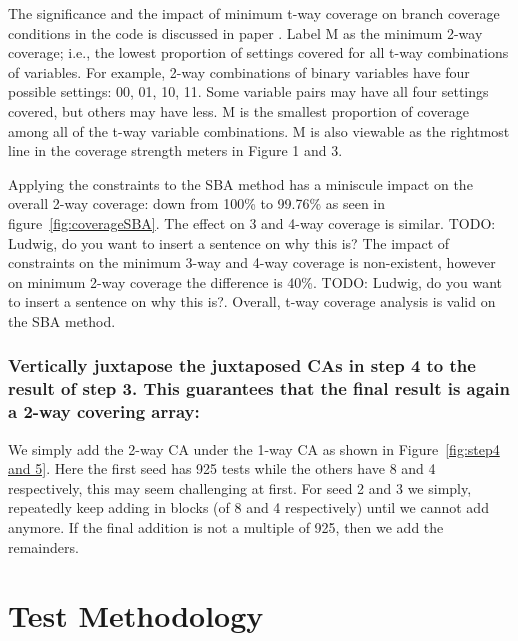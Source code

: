 \documentclass[conference]{IEEEtran}
\newcommand{\todo}[1]{}
\renewcommand{\todo}[1]{{\color{red} TODO: {#1}}}
\begin{document}
The significance and the impact of minimum t-way coverage on branch coverage conditions in the code is discussed in paper \cite{kuhn2016measuring}. 
Label M as the minimum 2-way coverage; i.e., the lowest proportion of settings covered for all t-way combinations of variables. 
For example, 2-way combinations of binary variables have four possible settings: 00, 01, 10, 11. Some variable pairs may have all four settings covered, but others may have less. 
M is the smallest proportion of coverage among all of the t-way variable combinations.  M is also viewable as the rightmost line in the coverage strength meters in Figure 1 and 3. 

%

Applying the constraints to the SBA method has a miniscule impact on the overall 2-way coverage: down from 100\% to 99.76\% as seen in figure~\ref{fig:coverageSBA}. 
The effect on 3 and 4-way coverage is similar. 
\todo{Ludwig, do you want to insert a sentence on why this is?}
The impact of constraints on the minimum 3-way and 4-way coverage is non-existent, however on minimum 2-way coverage the difference is 40\%. \todo{Ludwig, do you want to insert a sentence on why this is?}.
Overall, t-way coverage analysis is valid on the SBA method. 
	
	\subsubsection {Vertically juxtapose the juxtaposed CAs in step 4 to the result of step 3. This guarantees that the final result is again a 2-way covering array: } We simply add the 2-way CA under the 1-way CA as shown in Figure~\ref{fig:step4 and 5}. Here the first seed has 925 tests while the others have 8 and 4 respectively, this may seem challenging at first. 
	For seed 2 and 3 we simply, repeatedly keep adding in blocks (of 8 and 4 respectively) until we cannot add anymore. If the final addition is not a multiple of 925, then we add the remainders. 

\section{Test Methodology}
	
\end{document}
